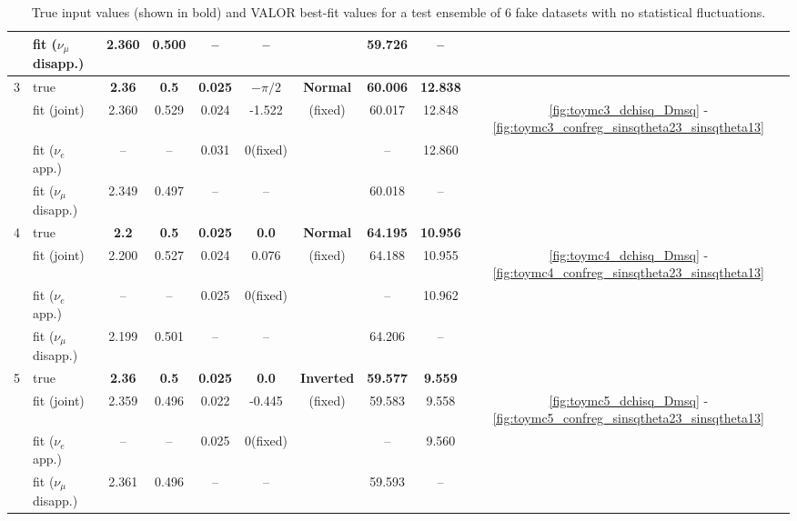 \begin{table}[htb]
\begin{tabular}{@{}| c | l | c  c  c  c| c | c  c  | c | |@{}}
   & fit ($\nu_{\mu}$ disapp.) & 2.360          & 0.500      & --         & --   &        & 59.726      & --          & \\
\hline
3  & true                      & {\bf 2.36 }   & {\bf 0.5}   & {\bf 0.025}   & {\bf $-\pi/2$} & {\bf Normal}   & {\bf 60.006}   & {\bf 12.838}    &\\
   & fit (joint)               & 2.360         & 0.529      & 0.024      & -1.522  & (fixed)     & 60.017      & 12.848       & \ref{fig:toymc3_dchisq_Dmsq} - \ref{fig:toymc3_confreg_sinsqtheta23_sinsqtheta13}\\
   & fit ($\nu_{e}$ app.)      & --                             & --         & 0.031      & 0(fixed)   &     & --         & 12.860       & \\
   & fit ($\nu_{\mu}$ disapp.) & 2.349         & 0.497      & --         & --    &     & 60.018      & --          & \\
\hline
4  & true                      & {\bf 2.2 }   & {\bf 0.5}   & {\bf 0.025}   & {\bf 0.0}  & {\bf Normal}  & {\bf 64.195}   & {\bf 10.956}    & \\
   & fit (joint)               & 2.200         & 0.527      & 0.024      & 0.076   & (fixed)    & 64.188      & 10.955       & \ref{fig:toymc4_dchisq_Dmsq} - \ref{fig:toymc4_confreg_sinsqtheta23_sinsqtheta13}\\
   & fit ($\nu_{e}$ app.)      & --                             & --         & 0.025      & 0(fixed)     &   & --         & 10.962       & \\
   & fit ($\nu_{\mu}$ disapp.) & 2.199          & 0.501      & --         & --   &      & 64.206      & --          &\\
\hline
5  & true                      & {\bf 2.36 }   & {\bf 0.5}   & {\bf 0.025}   & {\bf 0.0}  & {\bf Inverted}  & {\bf 59.577}   & {\bf 9.559}    & \\
   & fit (joint)               & 2.359         & 0.496      & 0.022      & -0.445    & (fixed)   & 59.583      & 9.558       & \ref{fig:toymc5_dchisq_Dmsq} - \ref{fig:toymc5_confreg_sinsqtheta23_sinsqtheta13}\\
   & fit ($\nu_{e}$ app.)      & --                             & --         & 0.025      & 0(fixed)    &     & --         & 9.560       & \\
   & fit ($\nu_{\mu}$ disapp.) & 2.361        & 0.496      & --         & --     &      & 59.593      & --          & \\
 
\hline
\end{tabular}
\caption{
  True input values (shown in bold) and VALOR best-fit values for a test ensemble of 6 fake datasets with no statistical fluctuations. 
}
\label{tab:toymc_fits:best_fit_values}
\end{table}

